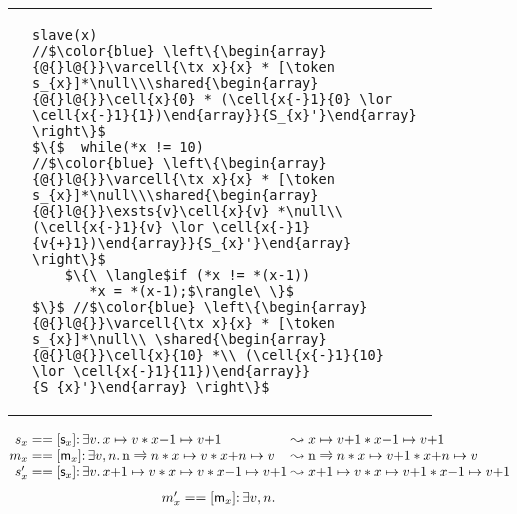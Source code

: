 \begin{figure}
\begin{tabular}{@{} l @{\hspace{2ex}} l@{}}
{\begin{lstlisting}
\end{lstlisting}}
&
\begin{lstlisting}
slave(x)
//$\color{blue} \left\{\begin{array}{@{}l@{}}\varcell{\tx x}{x} * [\token s_{x}]*\null\\\shared{\begin{array}{@{}l@{}}\cell{x}{0} * (\cell{x{-}1}{0} \lor \cell{x{-}1}{1})\end{array}}{S_{x}'}\end{array} \right\}$
$\{$  while(*x != 10)
//$\color{blue} \left\{\begin{array}{@{}l@{}}\varcell{\tx x}{x} * [\token s_{x}]*\null\\\shared{\begin{array}{@{}l@{}}\exsts{v}\cell{x}{v} *\null\\ (\cell{x{-}1}{v} \lor \cell{x{-}1}{v{+}1})\end{array}}{S_{x}'}\end{array} \right\}$
    $\{\ \langle$if (*x != *(x-1))
       *x = *(x-1);$\rangle\ \}$
$\}$ //$\color{blue} \left\{\begin{array}{@{}l@{}}\varcell{\tx x}{x} * [\token s_{x}]*\null\\ \shared{\begin{array}{@{}l@{}}\cell{x}{10} *\\ (\cell{x{-}1}{10} \lor \cell{x{-}1}{11})\end{array}}{S_{x}'}\end{array} \right\}$
\end{lstlisting}
\end{tabular}
\[
\begin{array}{@{}r@{}l@{}l@{}}
  s_x &\null ==
  [\token s_x]{:}\, \exsts{v} \cell{x}{v} * \cell{x{-}1}{v{+}1} &\null\swap
  \cell{x}{v{+}1} * \cell{x{-}1}{v{+}1}
  \\
  m_{x} &\null ==
  [\token m_{x}]{:}\, \exsts{v,n}\varcell{\tx n}{n} * \cell{x}{v} * \cell{x{+}n}{v} &\null\swap
  \varcell{\tx n}{n} * \cell{x}{v{+}1} * \cell{x{+}n}{v}
  \\
  s'_x &\null ==
  [\token s_x]{:}\, \exsts{v} \cell{x{+}1}{v} * \cell{x}{v} * \cell{x{-}1}{v{{+}}1} &\null\swap
  \cell{x{+}1}{v} * \cell{x}{v{+}1} * \cell{x{-}1}{v{+}1}
\end{array}
\]
\vspace{-8pt}
\[
\begin{array}{@{}r@{}l@{}}
  m'_{x} &\null ==
  [\token m_{x}]{:}\, \exsts{v,n}
  \begin{array}[t]{@{}l@{}}

\end{array}
\end{array}\]
\end{figure}

